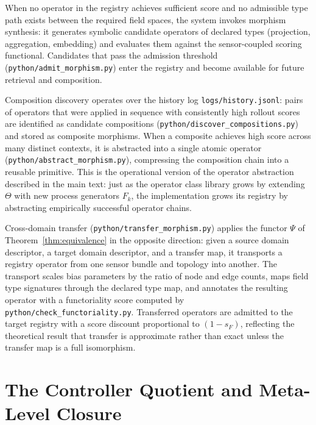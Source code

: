 \documentclass[12pt, oneside]{article}
\begin{document}
When no operator in the registry achieves sufficient score and no admissible type path
exists between the required field spaces, the system invokes morphism synthesis: it
generates symbolic candidate operators of declared types (projection, aggregation,
embedding) and evaluates them against the sensor-coupled scoring functional. Candidates
that pass the admission threshold (\texttt{python/admit\_morphism.py}) enter the registry
and become available for future retrieval and composition.

Composition discovery operates over the history log \texttt{logs/history.jsonl}: pairs
of operators that were applied in sequence with consistently high rollout scores are
identified as candidate compositions (\texttt{python/discover\_compositions.py}) and
stored as composite morphisms. When a composite achieves high score across many distinct
contexts, it is abstracted into a single atomic operator (\texttt{python/abstract\_morphism.py}),
compressing the composition chain into a reusable primitive. This is the operational
version of the operator abstraction described in the main text: just as the operator
class library grows by extending $\Theta$ with new process generators $F_k$, the
implementation grows its registry by abstracting empirically successful operator chains.

Cross-domain transfer (\texttt{python/transfer\_morphism.py}) applies the functor
$\Psi$ of Theorem~\ref{thm:equivalence} in the opposite direction: given a source domain
descriptor, a target domain descriptor, and a transfer map, it transports a registry
operator from one sensor bundle and topology into another. The transport scales
bias parameters by the ratio of node and edge counts, maps field type signatures through
the declared type map, and annotates the resulting operator with a functoriality score
computed by \texttt{python/check\_functoriality.py}. Transferred operators are admitted
to the target registry with a score discount proportional to $(1 - s_F)$, reflecting
the theoretical result that transfer is approximate rather than exact unless the transfer
map is a full isomorphism.

\section{The Controller Quotient and Meta-Level Closure}
\label{app:controller_quotient}
\end{document}
